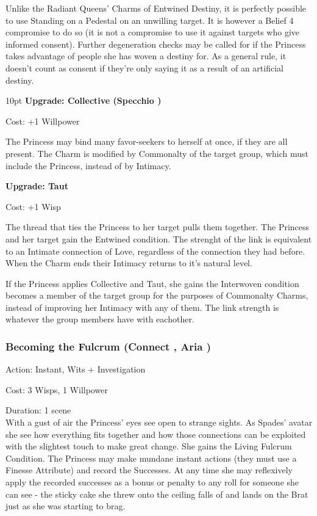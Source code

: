 Unlike the Radiant Queens' Charms of Entwined Destiny, it is perfectly possible to use Standing on a Pedestal on an unwilling target. It is however a Belief 4 compromise to do so (it is not a compromise to use it against targets who give informed consent). Further degeneration checks may be called for if the Princess takes advantage of people she has woven a destiny for. As a general rule, it doesn't count as consent if they're only saying it as a result of an artificial destiny.

\begin{myindentpar}{10pt} \textbf{Upgrade: Collective (Specchio \textbullet\textbullet\textbullet\textbullet)}

\noindent Cost: +1 Willpower

The Princess may bind many favor-seekers to herself at once, if they are all present. The Charm is modified by Commonalty of the target group, which must include the Princess, instead of by Intimacy.

\textbf{Upgrade: Taut}

\noindent Cost: +1 Wisp

The thread that ties the Princess to her target pulls them together. The Princess and her target gain the Entwined condition. The strenght of the link is equivalent to an Intimate connection of Love, regardless of the connection they had before. When the Charm ends their Intimacy returns to it's natural level.

If the Princess applies Collective and Taut, she gains the Interwoven condition becomes a member of the target group for the purposes of Commonalty Charms, instead of improving her Intimacy with any of them. The link strength is whatever the group members have with eachother.\end{myindentpar}


\subsubsection*{Becoming the Fulcrum (Connect \textbullet\textbullet\textbullet\textbullet\textbullet, Aria \textbullet\textbullet\textbullet\textbullet)}

\noindent Action: Instant, Wits + Investigation

\noindent Cost: 3 Wisps, 1 Willpower

\noindent Duration: 1 scene \\

\noindent With a gust of air the Princess' eyes see open to strange sights. As Spades' avatar she see how everything fits together and how those connections can be exploited with the slightest touch to make great change. She gains the Living Fulcrum Condition. The Princess may make mundane instant actions (they must use a Finesse Attribute) and record the Successes. At any time she may reflexively apply the recorded successes as a bonus or penalty to any roll for someone she can see - the sticky cake she threw onto the ceiling falls of and lands on the Brat just as she was starting to brag. 


